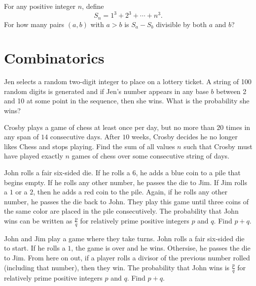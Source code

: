 \documentclass[11pt]{scrartcl}
\begin{document}
\begin{problem}
    For any positive integer $n$, define
    \[S_{n} = 1^{3} + 2^{3} + \cdots + n^{3}.\]
    For how many pairs $(a,b)$ with $a > b$ is $S_{a} - S_{b}$ divisible by both $a$ and $b$?
\end{problem}

\section{Combinatorics}

\begin{problem}
    Jen selects a random two-digit integer to place on a lottery ticket. A string of 100 random digits is generated and if Jen's number appears in any base $b$ between 2 and 10 at some point in the sequence, then she wins. What is the probability she wins?
\end{problem}

\begin{problem}[8-12]
    Crosby plays a game of chess at least once per day, but no more than $20$ times in any span of $14$ consecutive days. After $10$ weeks, Crosby decides he no longer likes Chess and stops playing. Find the sum of all values $n$ such that Crosby must have played exactly $n$ games of chess over some consecutive string of days.
\end{problem}

\begin{problem}
    John rolls a fair six-sided die. If he rolls a $6$, he adds a blue coin to a pile that begins empty. If he rolls any other number, he passes the die to Jim. If Jim rolls a $1$ or a $2$, then he adds a red coin to the pile. Again, if he rolls any other number, he passes the die back to John. They play this game until three coins of the same color are placed in the pile consecutively. The probability that John wins can be written as $\frac{p}{q}$ for relatively prime positive integers $p$ and $q$. Find $p + q$.
\end{problem}

\begin{problem}
    John and Jim play a game where they take turns. John rolls a fair six-sided die to start. If he rolls a $1$, the game is over and he wins. Othersise, he passes the die to Jim. From here on out, if a player rolls a divisor of the previous number rolled (including that number), then they win. The probability that John wins is $\frac{p}{q}$ for relatively prime positive integers $p$ and $q$. Find $p + q$.
\end{problem}
\end{document}
